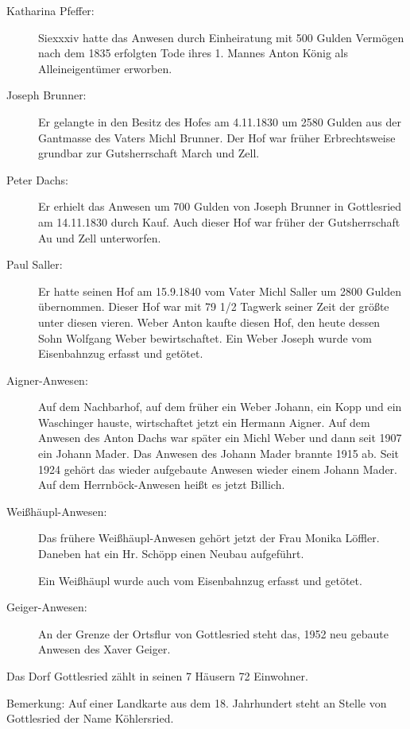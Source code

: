 \documentclass[12pt,a4pager]{book}
\begin{document}
\begin{description}
\item[Katharina Pfeffer:] Siexxxiv hatte das Anwesen durch Einheiratung mit 500
Gulden Vermögen nach dem 1835 erfolgten Tode ihres 1. Mannes Anton König als
Alleineigentümer erworben.

\item[Joseph Brunner:] Er gelangte in den Besitz des Hofes am 4.11.1830 um 2580
Gulden aus der Gantmasse des Vaters Michl Brunner. Der Hof war früher
Erbrechtsweise grundbar zur Gutsherrschaft March und Zell.

\item[Peter Dachs:] Er erhielt das Anwesen um 700 Gulden von Joseph Brunner in
Gottlesried am 14.11.1830 durch Kauf. Auch dieser Hof war früher der
Gutsherrschaft Au und Zell unterworfen.

\item[Paul Saller:] Er hatte seinen Hof am 15.9.1840 vom Vater Michl Saller um
2800 Gulden übernommen. Dieser Hof war mit 79 1/2 Tagwerk seiner Zeit der größte
unter diesen vieren. Weber Anton kaufte diesen Hof, den heute dessen Sohn
Wolfgang Weber bewirtschaftet. Ein Weber Joseph wurde vom Eisenbahnzug erfasst
und getötet.

\item[Aigner-Anwesen:] Auf dem Nachbarhof, auf dem früher ein Weber Johann, ein
Kopp und ein Waschinger hauste, wirtschaftet jetzt ein Hermann Aigner. Auf dem
Anwesen des Anton Dachs war später ein Michl Weber und dann seit 1907 ein Johann
Mader. Das Anwesen des Johann Mader brannte 1915 ab. Seit 1924 gehört das wieder
aufgebaute Anwesen wieder einem Johann Mader. Auf dem Herrnböck-Anwesen heißt es
jetzt Billich.

\item[Weißhäupl-Anwesen:] Das frühere Weißhäupl-Anwesen gehört jetzt der Frau
Monika Löffler. Daneben hat ein Hr. Schöpp einen Neubau aufgeführt.

Ein Weißhäupl wurde auch vom Eisenbahnzug erfasst und getötet.

\item[Geiger-Anwesen:] An der Grenze der Ortsflur von Gottlesried steht das,
1952 neu gebaute Anwesen des Xaver Geiger.
\end{description}

Das Dorf Gottlesried zählt in seinen 7 Häusern 72 Einwohner.

Bemerkung: Auf einer Landkarte aus dem 18. Jahrhundert steht an Stelle von
Gottlesried der Name Köhlersried.
\end{document}
